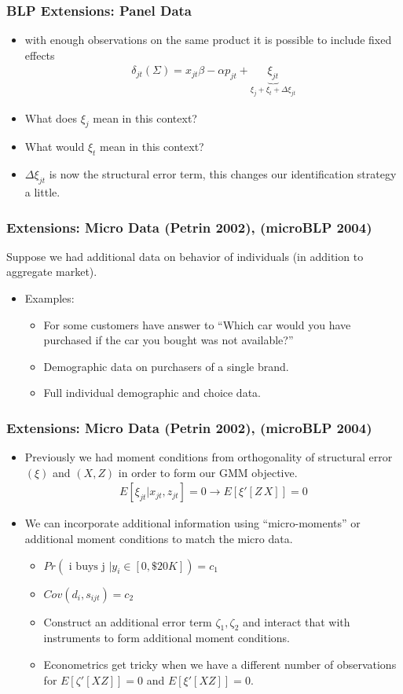 \documentclass[xcolor=pdftex,dvipsnames,table,mathserif,aspectratio=169]{beamer}
\begin{document}
\begin{frame}
\frametitle{BLP Extensions: Panel Data}
\begin{itemize}
\item with enough observations on the same product it is possible to include fixed effects
\begin{eqnarray*}
\delta_{jt}(\Sigma) = x_{jt} \beta - \alpha p_{jt} + \underbrace{\xi_{jt}}_{\xi_{j} + \xi_t + \Delta \xi_{jt}}
\end{eqnarray*}
\item What does $\xi_{j}$ mean in this context?
\item What would $\xi_t$ mean in this context?
\item $\Delta \xi_{jt}$ is now the structural error term, this changes our identification strategy a little.
\end{itemize}
\end{frame}

\begin{frame}
\frametitle{Extensions: Micro Data (Petrin 2002), (microBLP 2004)}
Suppose we had additional data on behavior of individuals (in addition to aggregate market).
\begin{itemize}
\item Examples:
\begin{itemize}
\item For some customers have answer to ``Which car would you have purchased if the car you bought was not available?''
\item Demographic data on purchasers of a single brand.
\item Full individual demographic and choice data.
\end{itemize}
\end{itemize}
\end{frame}

\begin{frame} \frametitle{Extensions: Micro Data (Petrin 2002), (microBLP 2004)}
\begin{itemize}
\item Previously we had moment conditions from orthogonality of structural error $(\xi)$ and $(X,Z)$ in order to form our GMM objective.
\begin{eqnarray*}
E[\xi_{jt} | x_{jt}, z_{jt}]=0 \rightarrow E[\xi'  [Z \, X]]=0
\end{eqnarray*}
\item We can incorporate additional information using ``micro-moments'' or additional moment conditions to match the micro data.
\begin{itemize}
\item $Pr(\mbox{ i buys j } | y_i \in [0,\$20K])= c_1$
\item $Cov(d_i, s_{ijt}) = c_2$
\item Construct an additional error term $\zeta_1,\zeta_2$ and interact that with instruments to form additional moment conditions.
\item Econometrics get tricky when we have a different number of observations for $E[\zeta' [X Z]]=0$ and $E[\xi' [X Z]]=0$.
\end{itemize}
\end{itemize}
\end{frame}
\end{document}
